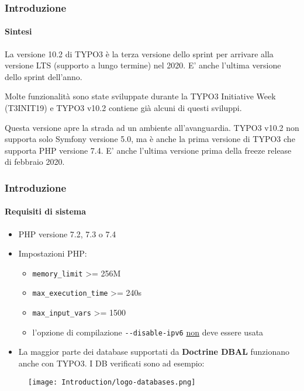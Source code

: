 \begin{frame}[fragile]
	\frametitle{Introduzione}
	\framesubtitle{Sintesi}

	\small
		La versione 10.2 di TYPO3 è la terza versione dello sprint per arrivare alla versione LTS
		(supporto a lungo termine) nel 2020. E' anche l'ultima versione dello sprint dell'anno.

		\vspace{0.2cm}

		Molte funzionalità sono state sviluppate durante la TYPO3 Initiative Week (T3INIT19)
		e TYPO3 v10.2 contiene già alcuni di questi sviluppi.

		\vspace{0.2cm}

		Questa versione apre la strada ad un ambiente all'avanguardia. TYPO3 v10.2 non supporta
		solo Symfony versione 5.0, ma è anche la prima versione di TYPO3 che supporta PHP
		versione 7.4. E' anche l'ultima versione prima della freeze release di febbraio 2020.

	\normalsize

\end{frame}


\begin{frame}[fragile]
	\frametitle{Introduzione}
	\framesubtitle{Requisiti di sistema}

	\begin{itemize}
		\item PHP versione 7.2, 7.3 o 7.4
		\item Impostazioni PHP:

			\begin{itemize}
				\item \texttt{memory\_limit} >= 256M
				\item \texttt{max\_execution\_time} >= 240s
				\item \texttt{max\_input\_vars} >= 1500
				\item l'opzione di compilazione \texttt{-}\texttt{-disable-ipv6} \underline{non} deve essere usata
			\end{itemize}

		\item La maggior parte dei database supportati da \textbf{Doctrine DBAL} funzionano anche con TYPO3.
			I DB verificati sono ad esempio:
	\end{itemize}

	\begin{figure}
		\texttt{[image: Introduction/logo-databases.png]}
	\end{figure}

\end{frame}


